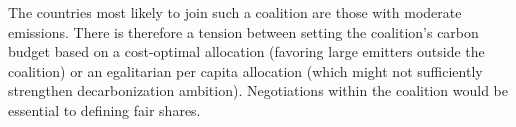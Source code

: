 \documentclass[12pt,english]{article}
\begin{document}

The countries most likely to join such a coalition are those with moderate emissions. There is therefore a tension between setting the coalition's carbon budget based on a cost-optimal allocation (favoring large emitters outside the coalition) or an egalitarian per capita allocation (which might not sufficiently strengthen decarbonization ambition). Negotiations within the coalition would be essential to defining fair shares.


\end{document}
